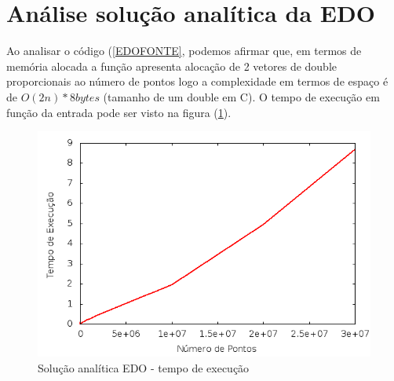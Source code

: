 \section{Análise solução analítica da EDO}
Ao analisar o código (\ref{EDOFONTE}, podemos afirmar que, em termos de memória alocada a função apresenta alocação de 2 vetores de double proporcionais ao número de pontos logo a complexidade em termos de espaço é de $O(2n) * 8bytes$ (tamanho de um double em C). O tempo de execução em função da entrada pode ser visto na figura (\ref{tmpExecAnalitica}).
\begin{figure}[!htb]
\centering
\begin{minipage}[b]{0.45\linewidth}
\includegraphics[width=\linewidth]{./img/AspectosNumericos/SolExacComplexidade.png}
\caption{Solução analítica EDO - tempo de execução}
\label{tmpExecAnalitica}
\end{minipage} \hfill
\end{figure}

